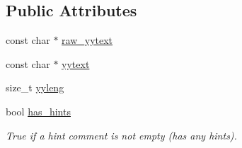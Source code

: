 \subsection*{Public Attributes}
\begin{DoxyCompactItemize}
\item 
const char $\ast$ \mbox{\hyperlink{classHint__scanner_a20ecccc8d99baaf45ce8b40e436b2c46}{raw\+\_\+yytext}}
\item 
const char $\ast$ \mbox{\hyperlink{classHint__scanner_a859fc3f9da20043fc962f81a75b25587}{yytext}}
\item 
size\+\_\+t \mbox{\hyperlink{classHint__scanner_a621416d10cdbca82e6f5a7d67b2795dd}{yyleng}}
\item 
\mbox{\label{classHint__scanner_a85153bc8ec27dfbfa351451d17d72083}} 
bool \mbox{\hyperlink{classHint__scanner_a85153bc8ec27dfbfa351451d17d72083}{has\+\_\+hints}}
\begin{DoxyCompactList}\small\item\em True if a hint comment is not empty (has any hints). \end{DoxyCompactList}\end{DoxyCompactItemize}
